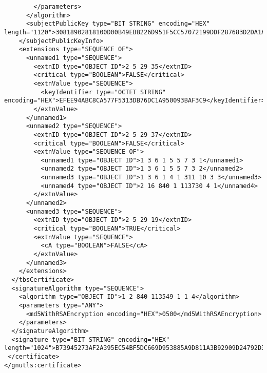 \begin{verbatim}
        </parameters>
      </algorithm>
      <subjectPublicKey type="BIT STRING" encoding="HEX" length="1120">30818902818100D00B49EBB226D951F5CC57072199DDF287683D2DA1A0EFCC96BFF73164777C78C3991E92EDA66584E7B97BAB4BE68D595D225557E01E7E57B5C35C04B491948C5C427AD588D8C6989764996D6D44E17B65CCFC86F3B4842DE559B730C1DE3AEF1CE1A328AFF8A357EBA911E1F7E8FC1598E21E4BF721748C587F50CF46157D950203010001</subjectPublicKey>
    </subjectPublicKeyInfo>
    <extensions type="SEQUENCE OF">
      <unnamed1 type="SEQUENCE">
        <extnID type="OBJECT ID">2 5 29 35</extnID>
        <critical type="BOOLEAN">FALSE</critical>
        <extnValue type="SEQUENCE">
          <keyIdentifier type="OCTET STRING" encoding="HEX">EFEE94ABC8CA577F5313DB76DC1A950093BAF3C9</keyIdentifier>
        </extnValue>
      </unnamed1>
      <unnamed2 type="SEQUENCE">
        <extnID type="OBJECT ID">2 5 29 37</extnID>
        <critical type="BOOLEAN">FALSE</critical>
        <extnValue type="SEQUENCE OF">
          <unnamed1 type="OBJECT ID">1 3 6 1 5 5 7 3 1</unnamed1>
          <unnamed2 type="OBJECT ID">1 3 6 1 5 5 7 3 2</unnamed2>
          <unnamed3 type="OBJECT ID">1 3 6 1 4 1 311 10 3 3</unnamed3>
          <unnamed4 type="OBJECT ID">2 16 840 1 113730 4 1</unnamed4>
        </extnValue>
      </unnamed2>
      <unnamed3 type="SEQUENCE">
        <extnID type="OBJECT ID">2 5 29 19</extnID>
        <critical type="BOOLEAN">TRUE</critical>
        <extnValue type="SEQUENCE">
          <cA type="BOOLEAN">FALSE</cA>
        </extnValue>
      </unnamed3>
    </extensions>
  </tbsCertificate>
  <signatureAlgorithm type="SEQUENCE">
    <algorithm type="OBJECT ID">1 2 840 113549 1 1 4</algorithm>
    <parameters type="ANY">
      <md5WithRSAEncryption encoding="HEX">0500</md5WithRSAEncryption>
    </parameters>
  </signatureAlgorithm>
  <signature type="BIT STRING" encoding="HEX" length="1024">B73945273AF2A395EC54BF5DC669D953885A9D811A3B92909D24792D36A44EC27E1C463AF8738BEFD29B311CCE8C6D9661BEC30911DAABB39B8813382B32D2E259581EBCD26C495C083984763966FF35D1DEFE432891E610C85072578DA7423244A8F5997B41A1F44E61F4F22C94375775055A5E72F25D5E4557467A91BD4251</signature>
 </certificate>
</gnutls:certificate>

\end{verbatim}
